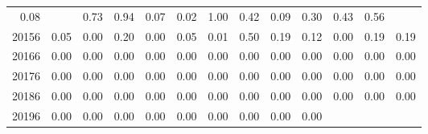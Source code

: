 \begin{table}[!h]
\begin{tabular}{lllllllllllll}
  \multicolumn{1}{|r}{0.08} &
  \multicolumn{1}{r}{} &
  \multicolumn{1}{r}{0.73} &
  \multicolumn{1}{r}{0.94} &
  \multicolumn{1}{r}{0.07} &
  \multicolumn{1}{r}{0.02} &
  \multicolumn{1}{r}{1.00} &
  \multicolumn{1}{r}{0.42} &
  \multicolumn{1}{r}{0.09} &
  \multicolumn{1}{r}{0.30} &
  \multicolumn{1}{r}{0.43} &
  \multicolumn{1}{r}{0.56} \\
\multicolumn{1}{l}{\hspace{1em}20156} &
  \multicolumn{1}{|r}{0.05} &
  \multicolumn{1}{r}{0.00} &
  \multicolumn{1}{r}{0.20} &
  \multicolumn{1}{r}{0.00} &
  \multicolumn{1}{r}{0.05} &
  \multicolumn{1}{r}{0.01} &
  \multicolumn{1}{r}{0.50} &
  \multicolumn{1}{r}{0.19} &
  \multicolumn{1}{r}{0.12} &
  \multicolumn{1}{r}{0.00} &
  \multicolumn{1}{r}{0.19} &
  \multicolumn{1}{r}{0.19} \\
\multicolumn{1}{l}{\hspace{1em}20166} &
  \multicolumn{1}{|r}{0.00} &
  \multicolumn{1}{r}{0.00} &
  \multicolumn{1}{r}{0.00} &
  \multicolumn{1}{r}{0.00} &
  \multicolumn{1}{r}{0.00} &
  \multicolumn{1}{r}{0.00} &
  \multicolumn{1}{r}{0.00} &
  \multicolumn{1}{r}{0.00} &
  \multicolumn{1}{r}{0.00} &
  \multicolumn{1}{r}{0.00} &
  \multicolumn{1}{r}{0.00} &
  \multicolumn{1}{r}{0.00} \\
\multicolumn{1}{l}{\hspace{1em}20176} &
  \multicolumn{1}{|r}{0.00} &
  \multicolumn{1}{r}{0.00} &
  \multicolumn{1}{r}{0.00} &
  \multicolumn{1}{r}{0.00} &
  \multicolumn{1}{r}{0.00} &
  \multicolumn{1}{r}{0.00} &
  \multicolumn{1}{r}{0.00} &
  \multicolumn{1}{r}{0.00} &
  \multicolumn{1}{r}{0.00} &
  \multicolumn{1}{r}{0.00} &
  \multicolumn{1}{r}{0.00} &
  \multicolumn{1}{r}{0.00} \\
\multicolumn{1}{l}{\hspace{1em}20186} &
  \multicolumn{1}{|r}{0.00} &
  \multicolumn{1}{r}{0.00} &
  \multicolumn{1}{r}{0.00} &
  \multicolumn{1}{r}{0.00} &
  \multicolumn{1}{r}{0.00} &
  \multicolumn{1}{r}{0.00} &
  \multicolumn{1}{r}{0.00} &
  \multicolumn{1}{r}{0.00} &
  \multicolumn{1}{r}{0.00} &
  \multicolumn{1}{r}{0.00} &
  \multicolumn{1}{r}{0.00} &
  \multicolumn{1}{r}{0.00} \\
\multicolumn{1}{l}{\hspace{1em}20196} &
  \multicolumn{1}{|r}{0.00} &
  \multicolumn{1}{r}{0.00} &
  \multicolumn{1}{r}{0.00} &
  \multicolumn{1}{r}{0.00} &
  \multicolumn{1}{r}{0.00} &
  \multicolumn{1}{r}{0.00} &
  \multicolumn{1}{r}{0.00} &
  \multicolumn{1}{r}{0.00} &
  \multicolumn{1}{r}{0.00} &

\end{tabular}
\end{table}
